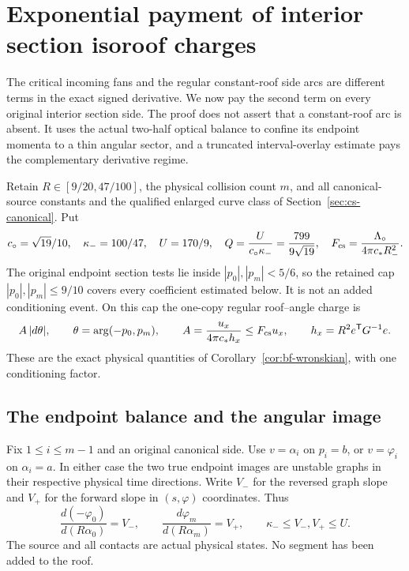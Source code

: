 \section{Exponential payment of interior section isoroof charges}
\label{sec:iso-section}

The critical incoming fans and the regular constant-roof side arcs
are different terms in the exact signed derivative. We now pay the
second term on every original interior section side. The proof does
not assert that a constant-roof arc is absent. It uses the actual
two-half optical balance to confine its endpoint momenta to a thin
angular sector, and a truncated interval-overlay estimate pays the
complementary derivative regime.

Retain $R\in[9/20,47/100]$, the physical collision count $m$, and all
canonical-source constants and the qualified enlarged curve class
of Section~\ref{sec:cs-canonical}. Put
\begin{equation}\label{eq:iso-constants}
 c_\circ=\sqrt{19}/10,\quad \kappa_-=100/47,\quad U=170/9,
 \quad Q=\frac{U}{c_\circ\kappa_-}=\frac{799}{9\sqrt{19}},
 \quad F_{\rm cs}=\frac{\Lambda_\circ}{4\pi c_*R_-^2}.
\end{equation}
The original endpoint section tests lie inside $|p_0|,|p_m|<5/6$,
so the retained cap $|p_0|,|p_m|\le9/10$ covers every coefficient
estimated below. It is not an added conditioning event. On this cap
the one-copy regular roof--angle charge is
\[
 A\,|d\theta|,\qquad
 \theta=\arg(-p_0,p_m),\qquad
 A=\frac{u_x}{4\pi c_*h_x}\le F_{\rm cs}u_x,
 \qquad h_x=R^2 e^{\mathsf T}G^{-1}e.
\]
These are the exact physical quantities of
Corollary~\ref{cor:bf-wronskian}, with one conditioning factor.

\subsection{The endpoint balance and the angular image}

Fix $1\le i\le m-1$ and an original canonical side.
Use $v=\alpha_i$ on $p_i=b$, or $v=\varphi_i$ on
$\alpha_i=a$. In either case the two true endpoint images are
unstable graphs in their respective physical time directions.
Write $V_-$ for the reversed graph slope and $V_+$ for the
forward slope in $(s,\varphi)$ coordinates. Thus
\[
 \frac{d(-\varphi_0)}{d(R\alpha_0)}=V_-,
 \qquad \frac{d\varphi_m}{d(R\alpha_m)}=V_+,
 \qquad \kappa_-\le V_-,V_+\le U.
\]
The source and all contacts are actual physical states. No segment
has been added to the roof.

